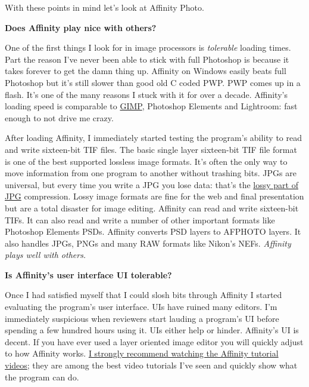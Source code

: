 With these points in mind let's look at Affinity Photo.


\medskip
\noindent\textbf{Does Affinity play nice with others?}
\medskip

One of the first things I look for in image processors is
\emph{tolerable} loading times. Part the reason I've never been able to
stick with full Photoshop is because it takes forever to get the damn
thing up. Affinity on Windows easily beats full Photoshop but it's still
slower than good old C coded PWP. PWP comes up in a flash. It's one of
the many reasons I stuck with it for over a decade. Affinity's loading
speed is comparable to \href{https://www.gimp.org/}{GIMP}, Photoshop
Elements and Lightroom: fast enough to not drive me crazy.

After loading Affinity, I immediately started testing the program's
ability to read and write sixteen-bit TIF files. The basic single layer
sixteen-bit TIF file format is one of the best supported lossless image
formats. It's often the only way to move information from one program to
another without trashing bits. JPGs are universal, but every time you
write a JPG you lose data: that's the
\href{http://www.howtogeek.com/142174/what-lossless-file-formats-are-why-you-shouldnt-convert-lossy-to-lossless/}{lossy
part of JPG} compression. Lossy image formats are fine for the web and
final presentation but are a total disaster for image editing. Affinity
can read and write sixteen-bit TIFs. It can also read and write a number
of other important formats like Photoshop Elements PSDs. Affinity
converts PSD layers to AFPHOTO layers. It also handles JPGs, PNGs and
many RAW formats like Nikon's NEFs. \emph{Affinity plays well with
others.}


\medskip
\noindent\textbf{Is Affinity's user interface UI tolerable?}
\medskip


Once I had satisfied myself that I could slosh bits through Affinity I
started evaluating the program's user interface. UIs have ruined many
editors. I'm immediately suspicious when reviewers start lauding a
program's UI before spending a few hundred hours using it. UIs either
help or hinder. Affinity's UI is decent. If you have ever used a layer
oriented image editor you will quickly adjust to how Affinity works.
\href{https://affinity.serif.com/forum/index.php?/topic/10119-in-house-affinity-photo-video-tutorials/}{I
strongly recommend watching the Affinity tutorial videos}; they are
among the best video tutorials I've seen and quickly show what the
program can do.

